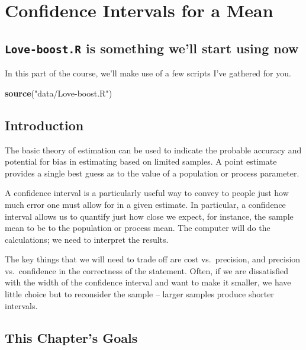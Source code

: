 \documentclass[
]{book}
\newenvironment{Shaded}{\begin{snugshade}}{\end{snugshade}}
\newcommand{\KeywordTok}[1]{\textcolor[rgb]{0.13,0.29,0.53}{\textbf{#1}}}
\newcommand{\NormalTok}[1]{#1}
\newcommand{\StringTok}[1]{\textcolor[rgb]{0.31,0.60,0.02}{#1}}
\begin{document}
\hypertarget{confidence-intervals-for-a-mean}{%
\chapter{Confidence Intervals for a Mean}\label{confidence-intervals-for-a-mean}}

\hypertarget{love-boost.r-is-something-well-start-using-now}{%
\section{\texorpdfstring{\texttt{Love-boost.R} is something we'll start using now}{Love-boost.R is something we'll start using now}}\label{love-boost.r-is-something-well-start-using-now}}

In this part of the course, we'll make use of a few scripts I've gathered for you.

\begin{Shaded}
\begin{Highlighting}[]
\KeywordTok{source}\NormalTok{(}\StringTok{"data/Love-boost.R"}\NormalTok{)}
\end{Highlighting}
\end{Shaded}

\hypertarget{introduction}{%
\section{Introduction}\label{introduction}}

The basic theory of estimation can be used to indicate the probable accuracy and potential for bias in estimating based on limited samples. A point estimate provides a single best guess as to the value of a population or process parameter.

A confidence interval is a particularly useful way to convey to people just how much error one must allow for in a given estimate. In particular, a confidence interval allows us to quantify just how close we expect, for instance, the sample mean to be to the population or process mean. The computer will do the calculations; we need to interpret the results.

The key things that we will need to trade off are cost vs.~precision, and precision vs.~confidence in the correctness of the statement. Often, if we are dissatisfied with the width of the confidence interval and want to make it smaller, we have little choice but to reconsider the sample -- larger samples produce shorter intervals.

\hypertarget{this-chapters-goals}{%
\section{This Chapter's Goals}\label{this-chapters-goals}}
\end{document}
